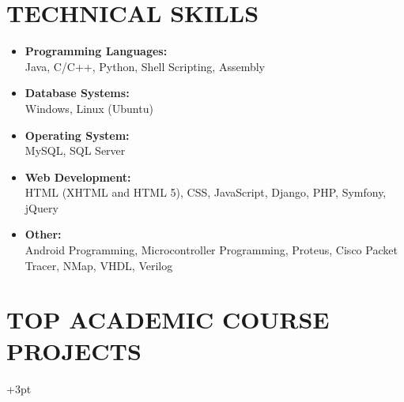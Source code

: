 \documentclass[margin]{res}
\begin{document}
\begin{resume}
\section{TECHNICAL SKILLS}
	
\begin{itemize} \itemsep -8pt

\item \textbf{Programming Languages:}\\
Java, C/C++, Python, Shell Scripting, Assembly                                                      \\

\item \textbf{Database Systems:}\\
Windows, Linux (Ubuntu)                                                                             \\

\item \textbf{Operating System:}\\
MySQL, SQL Server                                                                                   \\

\item \textbf{Web Development:}\\
HTML (XHTML and HTML 5), CSS, JavaScript, Django, PHP, Symfony, jQuery                              \\

\item \textbf{Other:}\\
Android Programming, Microcontroller Programming, Proteus, Cisco Packet Tracer, NMap, VHDL, Verilog \\
	
\end{itemize} 


\vspace{-6mm}

\section{TOP ACADEMIC COURSE PROJECTS}

\begin{itemize} \itemsep +3pt


\end{itemize}
\end{resume}
\end{document}
